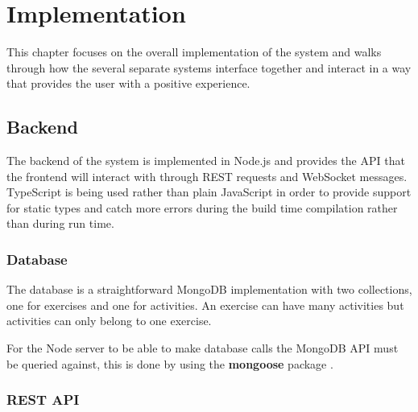 \chapter{Implementation}


This chapter focuses on the overall implementation of the system and walks through how the several separate systems interface together and interact in a way that provides the user with a positive experience.

\section{Backend}

The backend of the system is implemented in Node.js and provides the API that the frontend will interact with through REST requests and WebSocket messages. TypeScript \cite{typescript} is being used rather than plain JavaScript in order to provide support for static types and catch more errors during the build time compilation rather than during run time.

\subsection{Database}

The database is a straightforward MongoDB \cite{mongo} implementation with two collections, one for exercises and one for activities. An exercise can have many activities but activities can only belong to one exercise.


For the Node server to be able to make database calls the MongoDB API must be queried against, this is done by using the \textbf{mongoose} package \cite{mongoose}.

\subsection{REST API}

